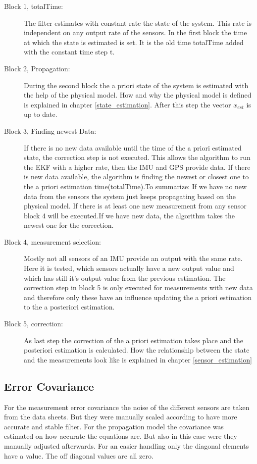 \begin{description}
\item[Block 1, totalTime:]
The filter estimates with constant rate the state of the system. This rate is independent on any output rate of the sensors. In the first block the time at which the state is estimated is set. It is the old time totalTime added with the constant time step t.

\item[Block 2, Propagation:]
During the second block the a priori state of the system is estimated with the help of the physical model. How and why the physical model is defined is explained in chapter \ref{state_estimation}. After this step the vector $x_{est}$ is up to date.

\item[Block 3, Finding newest Data:]
If there is no new data available until the time of the a priori estimated state, the correction step is not executed. This allows the algorithm to run the EKF with a higher rate, then the IMU and GPS provide data. If there is new data available, the algorithm is finding the newest or closest one to the a priori estimation time(totalTime).To summarize: If we have no new data from the sensors the system just keeps propagating based on the physical model. If there is at least one new measurement from any sensor block 4 will be executed.If we have new data, the algorithm takes the newest one for the correction.

\item[Block 4, measurement selection:]
Mostly not all sensors of an IMU provide an output with the same rate. Here it is tested, which sensors actually have a new output value and which has still it's output value from the previous estimation. The correction step in block 5 is only executed for measurements with new data and therefore only these have an influence updating the a priori estimation to the a posteriori estimation.

\item[Block 5, correction:]
As last step the correction of the a priori estimation takes place and the posteriori estimation is calculated. How the relationship between the state and the measurements look like is explained in chapter \ref{sensor_estimation}
\end{description}


\subsection*{Error Covariance}
For the measurement error covariance the noise of the different sensors are taken from the data sheets. But  they were manually scaled according to have more accurate and stable filter. For the propagation model the covariance was estimated on how accurate the equations are. But also in this case were they manually adjusted afterwards. For an easier handling only the diagonal elements have a value. The off diagonal values are all zero.

